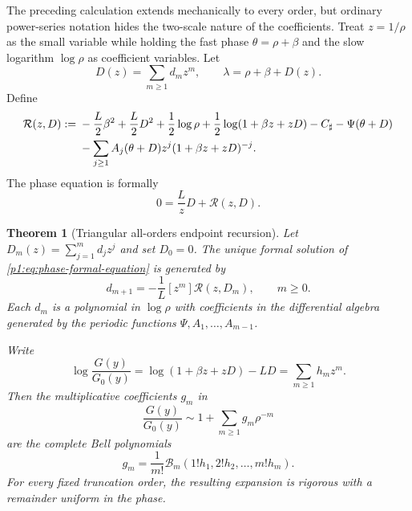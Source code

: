 \documentclass[11pt,oneside]{article}
\numberwithin{equation}{section}
\newtheorem{theorem}{Theorem}[section]
\theoremstyle{definition}
\theoremstyle{remark}
\begin{document}
The preceding calculation extends mechanically to every order, but ordinary power-series
notation hides the two-scale nature of the coefficients.  Treat $z=1/\rho$ as the small
variable while holding the fast phase $\theta=\rho+\beta$ and the slow logarithm
$\log\rho$ as coefficient variables.  Let
\begin{equation}
 D(z)=\sum_{m\ge1}d_mz^m,
 \qquad
 \lambda=\rho+\beta+D(z).
 \label{p1:eq:D-formal}
\end{equation}
Define
\begin{align}
 \mathcal R(z,D):={}&-\frac L2\beta^2+\frac L2D^2+\frac12\log\rho
 +\frac12\log(1+\beta z+zD)-C_{\sharp}-\Psi(\theta+D)
 \notag\\
 &-\sum_{j\ge1}A_j(\theta+D)z^j(1+\beta z+zD)^{-j}.
 \label{p1:eq:R-formal-endpoint}
\end{align}
The phase equation is formally
\begin{equation}
 0=\frac LzD+\mathcal R(z,D).
 \label{p1:eq:phase-formal-equation}
\end{equation}

\begin{theorem}[Triangular all-orders endpoint recursion]
\label{p1:thm:all-orders-endpoint-recursion}
Let $D_m(z)=\sum_{j=1}^{m}d_jz^j$ and set $D_0=0$.  The unique formal
solution of \eqref{p1:eq:phase-formal-equation} is generated by
\begin{equation}
 \boxed{
 d_{m+1}=-\frac1L[z^m]\mathcal R(z,D_m),
 \qquad m\ge0.}
 \label{p1:eq:d-all-orders-recursion}
\end{equation}
Each $d_m$ is a polynomial in $\log\rho$ with coefficients in the differential algebra
generated by the periodic functions $\Psi,A_1,\ldots,A_{m-1}$.

Write
\begin{equation}
 \log\frac{G(y)}{G_0(y)}
 =\log(1+\beta z+zD)-LD
 =\sum_{m\ge1}h_mz^m.
 \label{p1:eq:h-all-orders}
\end{equation}
Then the multiplicative coefficients $g_m$ in
\begin{equation}
 \frac{G(y)}{G_0(y)}\sim1+\sum_{m\ge1}g_m\rho^{-m}
 \label{p1:eq:g-all-orders}
\end{equation}
are the complete Bell polynomials
\begin{equation}
 \boxed{
 g_m=\frac1{m!}\mathcal B_m(1!h_1,2!h_2,\ldots,m!h_m).}
 \label{p1:eq:g-Bell}
\end{equation}
For every fixed truncation order, the resulting expansion is rigorous with a remainder
uniform in the phase.
\end{theorem}
\end{document}
